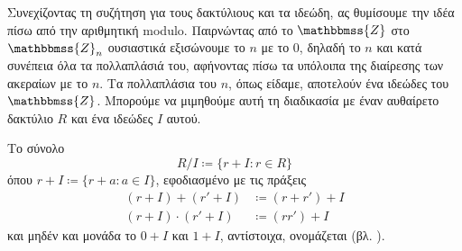 \documentclass[12pt,a4paper,reqno]{amsart}
\theoremstyle{definition}
\theoremstyle{remark}
\numberwithin{theorem}{section}
\numberwithin{exercise}{section}
\numberwithin{equation}{section}
\newcommand{\ZZ}{\mathbbmss{Z}}
\newcommand{\defn}[1]{{\color{mylightblue}{#1}}}
\begin{document}
Συνεχίζοντας τη συζήτηση για τους δακτύλιους και τα ιδεώδη, ας θυμίσουμε την ιδέα πίσω από την αριθμητική modulo. Παιρνώντας από το $\ZZ$ στο $\ZZ_n$ ουσιαστικά εξισώνουμε το $n$ με το $0$, δηλαδή  το $n$ και κατά συνέπεια όλα τα πολλαπλάσιά του, αφήνοντας πίσω τα υπόλοιπα της διαίρεσης των ακεραίων με το $n$. Τα πολλαπλάσια του $n$, όπως είδαμε, αποτελούν ένα ιδεώδες του $\ZZ$. Μπορούμε να μιμηθούμε αυτή τη διαδικασία με έναν αυθαίρετο δακτύλιο $R$ και ένα ιδεώδες $I$ αυτού.

Το σύνολο 
\[
R/I \coloneqq \{r + I : r \in R\}
\]
όπου $r + I \coloneqq \{r + a : a \in I\}$, εφοδιασμένο με τις πράξεις 
\begin{align*}
    \left(r+I\right) + \left(r'+I\right) &\coloneqq (r+r') + I \\
    \left(r+I\right)\cdot\left(r'+I\right) &\coloneqq (rr') + I
\end{align*}
και μηδέν και μονάδα το $0+I$ και $1+I$, αντίστοιχα, ονομάζεται \defn{δακτύλιος πηλίκο} (βλ. \cite[Παράγραφος~8.2.1]{Mpe15}).
\end{document}
